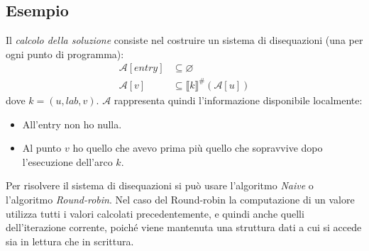\documentclass[a4paper,oneside,titlepage]{book}
\begin{document}
\subsection{Esempio}
\label{avail5}
Il \textit{calcolo della soluzione} consiste nel costruire un sistema di disequazioni (una per ogni punto di programma):
\begin{align*}
    \mathcal{A}[entry] &\subseteq \varnothing \\
    \mathcal{A}[v] &\subseteq \llbracket k \rrbracket^\# (\mathcal{A}[u])
\end{align*}
dove $k=(u,lab,v)$. $\mathcal{A}$ rappresenta quindi l'informazione disponibile localmente:
\begin{itemize}
    \item All'entry non ho nulla.
    \item Al punto $v$ ho quello che avevo prima più quello che sopravvive dopo l'esecuzione dell'arco $k$.
\end{itemize}
Per risolvere il sistema di disequazioni si può usare l'algoritmo \textit{Naive} o l'algoritmo \textit{Round-robin}. Nel caso del Round-robin la computazione di un valore utilizza tutti i valori calcolati precedentemente, e quindi anche quelli dell'iterazione corrente, poiché viene mantenuta una struttura dati a cui si accede sia in lettura che in scrittura.
\end{document}
